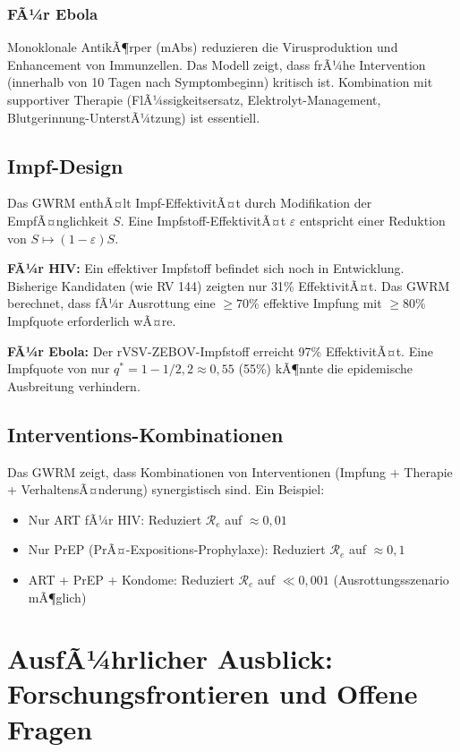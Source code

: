 ﻿\documentclass[a4paper,12pt]{article}
\theoremstyle{definition}
\begin{document}
\subsubsection{FÃ¼r Ebola}
Monoklonale AntikÃ¶rper (mAbs) reduzieren die Virusproduktion und Enhancement von Immunzellen. Das Modell zeigt, dass frÃ¼he Intervention (innerhalb von 10 Tagen nach Symptombeginn) kritisch ist. Kombination mit supportiver Therapie (FlÃ¼ssigkeitsersatz, Elektrolyt-Management, Blutgerinnung-UnterstÃ¼tzung) ist essentiell.

\subsection{Impf-Design}

Das GWRM enthÃ¤lt Impf-EffektivitÃ¤t durch Modifikation der EmpfÃ¤nglichkeit $S$. Eine Impfstoff-EffektivitÃ¤t $\varepsilon$ entspricht einer Reduktion von $S \mapsto (1-\varepsilon) S$.

\textbf{FÃ¼r HIV:} Ein effektiver Impfstoff befindet sich noch in Entwicklung. Bisherige Kandidaten (wie RV 144) zeigten nur 31\% EffektivitÃ¤t. Das GWRM berechnet, dass fÃ¼r Ausrottung eine $\geq 70\%$ effektive Impfung mit $\geq 80\%$ Impfquote erforderlich wÃ¤re.

\textbf{FÃ¼r Ebola:} Der rVSV-ZEBOV-Impfstoff erreicht 97\% EffektivitÃ¤t. Eine Impfquote von nur $q^* = 1 - 1/2,2 \approx 0,55$ (55\%) kÃ¶nnte die epidemische Ausbreitung verhindern.

\subsection{Interventions-Kombinationen}

Das GWRM zeigt, dass Kombinationen von Interventionen (Impfung + Therapie + VerhaltensÃ¤nderung) synergistisch sind. Ein Beispiel:
\begin{itemize}
\item Nur ART fÃ¼r HIV: Reduziert $\mathcal{R}_e$ auf $\approx 0,01$
\item Nur PrEP (PrÃ¤-Expositions-Prophylaxe): Reduziert $\mathcal{R}_e$ auf $\approx 0,1$
\item ART + PrEP + Kondome: Reduziert $\mathcal{R}_e$ auf $\ll 0,001$ (Ausrottungsszenario mÃ¶glich)
\end{itemize}

\section{AusfÃ¼hrlicher Ausblick: Forschungsfrontieren und Offene Fragen}
\end{document}
